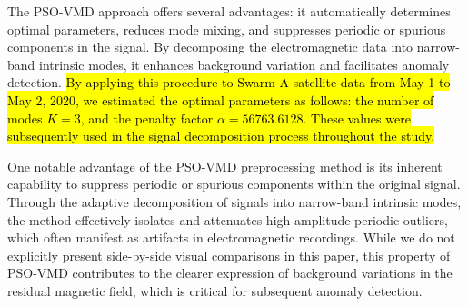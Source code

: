 \documentclass[3p,authoryear,preprint,12pt]{elsarticle}
\begin{document}
%
{The PSO-VMD approach offers several advantages: it automatically determines optimal parameters, reduces mode mixing, and suppresses periodic or spurious components in the signal. By decomposing the electromagnetic data into narrow-band intrinsic modes, it enhances background variation and facilitates anomaly detection.
} \hl{By applying this procedure to Swarm A satellite data from May 1 to May 2, 2020, we estimated the optimal parameters as follows: the number of modes $K=3$, and the penalty factor $\alpha=56763.6128$. These values were subsequently used in the signal decomposition process throughout the study.}

{One notable advantage of the PSO-VMD preprocessing method is its inherent capability to suppress periodic or spurious components within the original signal. Through the adaptive decomposition of signals into narrow-band intrinsic modes, the method effectively isolates and attenuates high-amplitude periodic outliers, which often manifest as artifacts in electromagnetic recordings. While we do not explicitly present side-by-side visual comparisons in this paper, this property of PSO-VMD contributes to the clearer expression of background variations in the residual magnetic field, which is critical for subsequent anomaly detection.}
\end{document}
